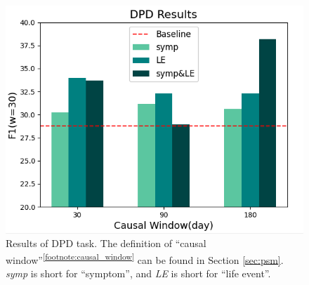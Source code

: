 \begin{figure}[th]
	\centering
	\includegraphics[width=0.9\linewidth]{figures/DPD.png}
	\caption{Results of DPD task. The definition of ``causal window''\textsuperscript{\ref{footnote:causal_window}} can be found in Section \ref{sec:psm}. \textit{symp} is short for ``symptom'', and \textit{LE} is short for ``life event''.}
	\label{fig:DPD_result}
\end{figure}








